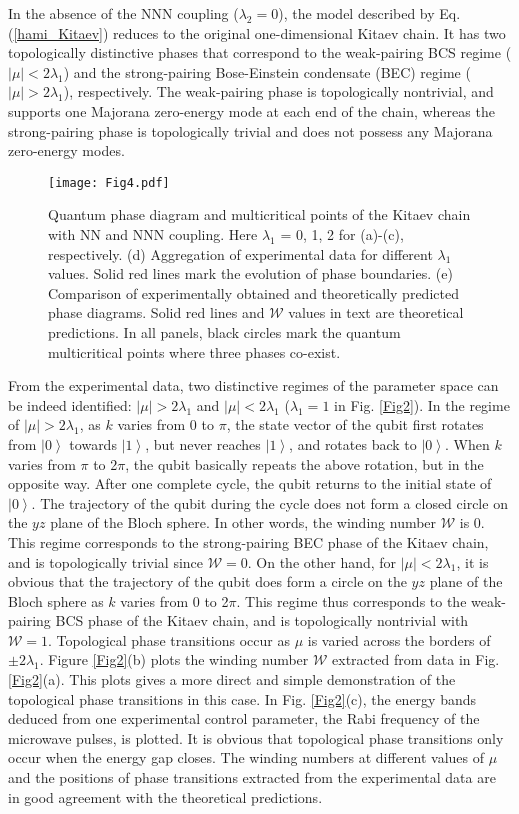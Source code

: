\documentclass[aps,reprint,groupedaddress,showpacs,superscriptaddress]{revtex4-1}
\newcommand{\ket}[1]{\left| #1 \right>} %
\begin{document}
In the absence of the NNN coupling ($\lambda_{2}=0$), the model described by Eq.(\ref{hami_Kitaev}) reduces to the original one-dimensional Kitaev chain. It has two topologically distinctive phases that correspond to the weak-pairing BCS regime ($|\mu|<2\lambda_{1}$) and the strong-pairing Bose-Einstein condensate (BEC) regime ($|\mu|>2\lambda_{1}$), respectively\cite{Alicea2012}. The weak-pairing phase is topologically nontrivial, and supports one Majorana zero-energy mode at each end of the chain, whereas the strong-pairing phase is topologically trivial and does not possess any Majorana zero-energy modes.


\begin{figure*}
	\centering
	\texttt{[image: Fig4.pdf]}
	\caption{Quantum phase diagram and multicritical points of the Kitaev chain with NN and NNN coupling. Here $\lambda_{1}$ = 0, 1, 2 for (a)-(c), respectively. (d) Aggregation of experimental data for different $\lambda_{1}$ values. Solid red lines mark the evolution of phase boundaries. (e) Comparison of experimentally obtained and theoretically predicted phase diagrams. Solid red lines and $\mathcal{W}$ values in text are theoretical predictions. In all panels, black circles mark the quantum multicritical points where three phases co-exist. }\label{Fig4}
\end{figure*}

From the experimental data, two distinctive regimes of the parameter space can be indeed identified: $|\mu|>2\lambda_{1}$ and $|\mu|<2\lambda_{1}$ ($\lambda_{1}=1$ in Fig. \ref{Fig2}). In the regime of $|\mu|>2\lambda_{1}$, as $k$ varies from 0 to $\pi$, the state vector of the qubit first rotates from $\ket{0}$ towards $\ket{1}$, but never reaches $\ket{1}$, and rotates back to $\ket{0}$. When $k$ varies from $\pi$ to 2$\pi$, the qubit basically repeats the above rotation, but in the opposite way. After one complete cycle, the qubit returns to the initial state of $\ket{0}$. The trajectory of the qubit during the cycle does not form a closed circle on the $yz$ plane of the Bloch sphere. In other words, the winding number $\mathcal{W}$ is 0. This regime corresponds to the strong-pairing BEC phase of the Kitaev chain, and is topologically trivial since $\mathcal{W}=0$. On the other hand, for $|\mu|<2\lambda_{1}$, it is obvious that the trajectory of the qubit does form a circle on the $yz$ plane of the Bloch sphere as $k$ varies from 0 to 2$\pi$. This regime thus corresponds to the weak-pairing BCS phase of the Kitaev chain, and is topologically nontrivial with $\mathcal{W}=1$. Topological phase transitions occur as $\mu$ is varied across the borders of $\pm2\lambda_{1}$. Figure \ref{Fig2}(b) plots the winding number $\mathcal{W}$ extracted from data in Fig. \ref{Fig2}(a). This plots gives a more direct and simple demonstration of the topological phase transitions in this case. In Fig. \ref{Fig2}(c), the energy bands deduced from one experimental control parameter, the Rabi frequency of the microwave pulses, is plotted. It is obvious that topological phase transitions only occur when the energy gap closes. The winding numbers at different values of $\mu$ and the positions of phase transitions extracted from the experimental data are in good agreement with the theoretical predictions. 
\end{document}
